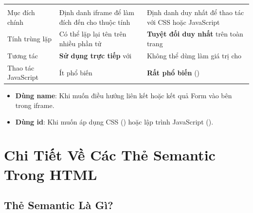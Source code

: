 \begin{prettyTableBox}
\begin{tabularx}{\linewidth}{K{2.5cm} Z Z}
 &  &  \\
Mục đích chính & Định danh iframe để làm đích đến cho thuộc tính  & Định danh duy nhất để thao tác với CSS hoặc JavaScript \\
Tính trùng lặp & Có thể lặp lại tên trên nhiều phần tử & \textbf{Tuyệt đối duy nhất} trên toàn trang \\
Tương tác  & \textbf{Sử dụng trực tiếp} với  & Không thể dùng làm giá trị cho  \\
Thao tác JavaScript & Ít phổ biến & \textbf{Rất phổ biến} () \\
\end{tabularx}
\end{prettyTableBox}

\begin{conceptBox}
\begin{itemize}[leftmargin=1.5em, itemsep=3pt, parsep=0pt]
    \item \textbf{Dùng name}: Khi muốn điều hướng liên kết  hoặc kết quả Form  vào bên trong iframe.
    \item \textbf{Dùng id}: Khi muốn áp dụng CSS () hoặc lập trình JavaScript ().
\end{itemize}
\end{conceptBox}

\section{Chi Tiết Về Các Thẻ Semantic Trong HTML}
\label{sec:semantic_html5_masterclass}

\subsection{Thẻ Semantic Là Gì?}

